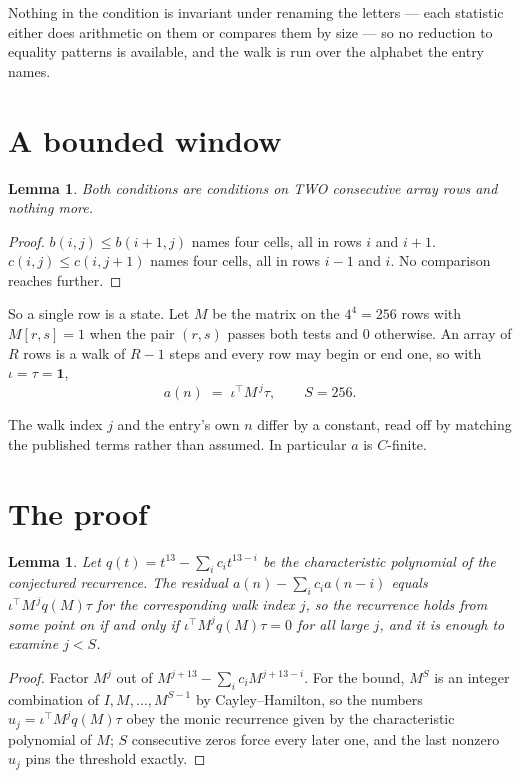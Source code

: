 \documentclass[11pt,a4paper]{article}
\theoremstyle{plain}
\newtheorem{lemma}[theorem]{Lemma}
\theoremstyle{definition}
\begin{document}
Nothing in the condition is invariant under renaming the letters --- each statistic either does
arithmetic on them or compares them by size --- so no reduction to equality patterns is
available, and the walk is run over the alphabet the entry names.

\section{A bounded window}

\begin{lemma}\label{lem:win}
Both conditions are conditions on TWO consecutive array rows and nothing more.
\end{lemma}

\begin{proof}
$b(i,j)\le b(i{+}1,j)$ names four cells, all in rows $i$ and $i+1$. $c(i,j)\le c(i,j{+}1)$
names four cells, all in rows $i-1$ and $i$. No comparison reaches further.
\end{proof}

So a single row is a state. Let $M$ be the matrix on the $4^{4}=256$ rows with
$M[r,s]=1$ when the pair $(r,s)$ passes both tests and $0$ otherwise. An array of $R$ rows is a
walk of $R-1$ steps and every row may begin or end one, so with $\iota=\tau=\mathbf{1}$,
\[
a(n)\;=\;\iota^{\!\top}M^{\,j}\tau ,\qquad S=256.
\]

The walk index $j$ and the entry's own $n$ differ by a constant, read off by matching the
published terms rather than assumed. In particular $a$ is $C$-finite.

\section{The proof}

\begin{lemma}\label{lem:crit}
Let $q(t)=t^{13}-\sum_i c_it^{13-i}$ be the characteristic polynomial of the
conjectured recurrence. The residual $a(n)-\sum_ic_ia(n-i)$ equals
$\iota^{\!\top}M^{\,j}q(M)\tau$ for the corresponding walk index $j$, so the recurrence
holds from some point on if and only if $\iota^{\!\top}M^{j}q(M)\tau=0$ for all large $j$,
and it is enough to examine $j<S$.
\end{lemma}

\begin{proof}
Factor $M^{j}$ out of $M^{j+13}-\sum_ic_iM^{j+13-i}$. For the bound, $M^{S}$
is an integer combination of $I,M,\dots,M^{S-1}$ by Cayley--Hamilton, so the numbers
$u_j=\iota^{\!\top}M^{j}q(M)\tau$ obey the monic recurrence given by the characteristic
polynomial of $M$; $S$ consecutive zeros force every later one, and the last nonzero $u_j$
pins the threshold exactly.
\end{proof}
\end{document}
